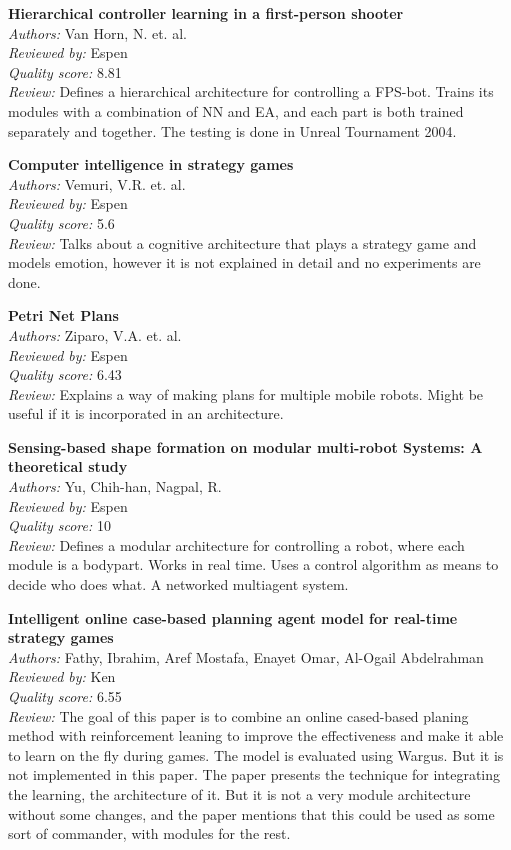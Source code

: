 \textbf{Hierarchical controller learning in a first-person shooter}\\
\textit{Authors:} Van Horn, N. et. al.\\
\textit{Reviewed by:} Espen\\
\textit{Quality score:} 8.81\\
\textit{Review:} Defines a hierarchical architecture for controlling a FPS-bot. Trains its modules with a combination of NN and EA, and each part is both trained separately and together. The testing is done in Unreal Tournament 2004. 

\textbf{Computer intelligence in strategy games}\\
\textit{Authors:} Vemuri, V.R. et. al.\\
\textit{Reviewed by:} Espen\\
\textit{Quality score:} 5.6\\
\textit{Review:} Talks about a cognitive architecture that plays a strategy game and models emotion, however it is not explained in detail and no experiments are done.

\textbf{Petri Net Plans}\\
\textit{Authors:} Ziparo, V.A. et. al.\\
\textit{Reviewed by:} Espen\\
\textit{Quality score:} 6.43\\
\textit{Review:} Explains a way of making plans for multiple mobile robots. Might be useful if it is incorporated in an architecture.

\textbf{Sensing-based shape formation on modular multi-robot Systems: A theoretical study}\\
\textit{Authors:} Yu, Chih-han, Nagpal, R.	\\
\textit{Reviewed by:} Espen\\
\textit{Quality score:} 10\\
\textit{Review:} Defines a modular architecture for controlling a robot, where each module is a bodypart. Works in real time. Uses a control algorithm as means to decide who does what. A networked multiagent system.

\textbf{Intelligent online case-based planning agent model for real-time strategy games}\\
\textit{Authors:} Fathy, Ibrahim, Aref Mostafa, Enayet Omar, Al-Ogail Abdelrahman	\\
\textit{Reviewed by:} Ken\\
\textit{Quality score:} 6.55\\
\textit{Review:} The goal of this paper is to combine an online cased-based planing method with reinforcement leaning to improve the effectiveness and make it able to learn on the fly during games. The model is evaluated using Wargus. But it is not implemented in this paper. The paper presents the technique for integrating the learning, the architecture of it. But it is not a  very module architecture without some changes, and the paper mentions that this could be used as some sort of commander, with modules for the rest.

